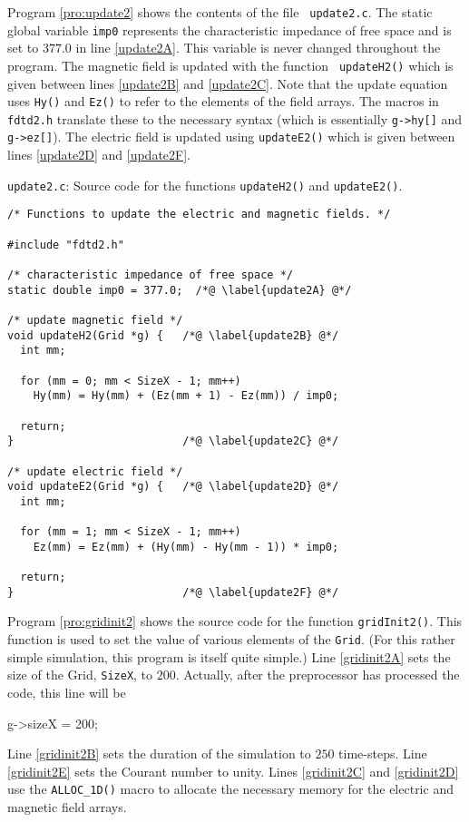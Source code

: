 Program \ref{pro:update2} shows the contents of the file {\tt
  update2.c}.  The static global variable {\tt imp0} represents the
characteristic impedance of free space and is set to $377.0$ in line
\ref{update2A}.  This variable is never changed throughout the
program.  The magnetic field is updated with the function {\tt
  updateH2()} which is given between lines \ref{update2B} and
\ref{update2C}.  Note that the update equation uses {\tt Hy()} and
{\tt Ez()} to refer to the elements of the field arrays.  The macros
in {\tt fdtd2.h} translate these to the necessary syntax (which is
essentially {\tt g->hy[]} and {\tt g->ez[]}).  The electric field is
updated using {\tt updateE2()} which is given between lines
\ref{update2D} and \ref{update2F}.

\begin{program}
{\tt update2.c}: Source code for the functions {\tt updateH2()} and
{\tt updateE2()}. \label{pro:update2} 
\codemiddle
\begin{lstlisting}
/* Functions to update the electric and magnetic fields. */

#include "fdtd2.h"

/* characteristic impedance of free space */
static double imp0 = 377.0;  /*@ \label{update2A} @*/

/* update magnetic field */
void updateH2(Grid *g) {   /*@ \label{update2B} @*/
  int mm;

  for (mm = 0; mm < SizeX - 1; mm++)
    Hy(mm) = Hy(mm) + (Ez(mm + 1) - Ez(mm)) / imp0;

  return;
}                          /*@ \label{update2C} @*/

/* update electric field */
void updateE2(Grid *g) {   /*@ \label{update2D} @*/
  int mm;

  for (mm = 1; mm < SizeX - 1; mm++)
    Ez(mm) = Ez(mm) + (Hy(mm) - Hy(mm - 1)) * imp0;

  return;
}                          /*@ \label{update2F} @*/
\end{lstlisting}
\end{program}

Program \ref{pro:gridinit2} shows the source code for the function
{\tt gridInit2()}.  This function is used to set the value of various
elements of the {\tt Grid}.  (For this rather simple simulation, this
program is itself quite simple.)  Line \ref{gridinit2A} sets the size
of the Grid, {\tt SizeX}, to $200$.  Actually, after the preprocessor
has processed the code, this line will be
\begin{code}
  g->sizeX = 200;
\end{code}
Line \ref{gridinit2B} sets the duration of the simulation to $250$
time-steps.  Line \ref{gridinit2E} sets the Courant number to unity.
Lines \ref{gridinit2C} and \ref{gridinit2D} use the {\tt ALLOC\_1D()}
macro to allocate the necessary memory for the electric and magnetic
field arrays.

